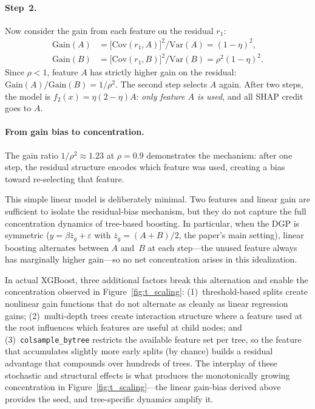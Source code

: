 \documentclass[10pt]{article}
\newcommand{\rhovar}{\rho}
\begin{document}
\paragraph{Step~2.}
Now consider the gain from each feature on the residual $r_1$:
\begin{align}
  \text{Gain}(A) &= \bigl[\text{Cov}(r_1, A)\bigr]^2 / \text{Var}(A) = (1 - \eta)^2, \\
  \text{Gain}(B) &= \bigl[\text{Cov}(r_1, B)\bigr]^2 / \text{Var}(B) = \rho^2(1 - \eta)^2.
\end{align}
Since $\rho < 1$, feature $A$ has strictly higher gain on the residual:
$\text{Gain}(A) / \text{Gain}(B) = 1/\rho^2$.  The second step selects
$A$ again.  After two steps, the model is $f_2(x) = \eta(2 - \eta) A$:
\emph{only feature $A$ is used}, and all SHAP credit goes to $A$.

\paragraph{From gain bias to concentration.}
The gain ratio $1/\rho^2 \approx 1.23$ at $\rhovar = 0.9$ demonstrates
the mechanism: after one step, the residual structure encodes which
feature was used, creating a bias toward re-selecting that feature.

This simple linear model is deliberately minimal.  Two features and
linear gain are sufficient to isolate the residual-bias mechanism, but
they do not capture the full concentration dynamics of tree-based
boosting.  In particular, when the DGP is symmetric
($y = \beta \bar{z}_g + \varepsilon$ with $\bar{z}_g = (A + B)/2$,
the paper's main setting), linear boosting alternates between $A$
and~$B$ at each step---the unused feature always has marginally higher
gain---so no net concentration arises in this idealization.

In actual XGBoost, three additional factors break this alternation and
enable the concentration observed in Figure~\ref{fig:t_scaling}:
(1)~threshold-based splits create nonlinear gain functions that do not
alternate as cleanly as linear regression gains;
(2)~multi-depth trees create interaction structure where a feature used
at the root influences which features are useful at child nodes; and
(3)~\texttt{colsample\_bytree} restricts the available feature set per
tree, so the feature that accumulates slightly more early splits
(by chance) builds a residual advantage that compounds over hundreds
of trees.  The interplay of these stochastic and structural effects is
what produces the monotonically growing concentration in
Figure~\ref{fig:t_scaling}---the linear gain-bias derived above provides
the seed, and tree-specific dynamics amplify it.
\end{document}
